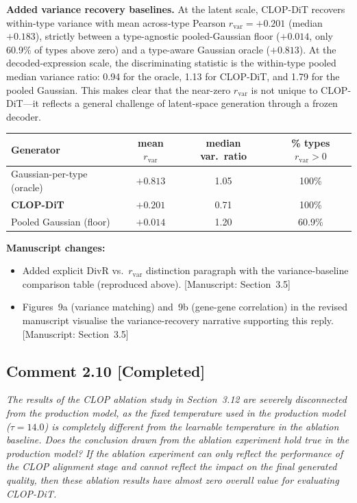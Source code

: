 \documentclass[11pt,letterpaper]{article}
\newcommand{\statuscompleted}{\textcolor{statusgreen}{\textbf{[Completed]}}}
\newcommand{\msref}[1]{\textcolor{blue!60!black}{\textsf{[Manuscript: #1]}}}
\begin{document}
\begin{revisionupdate}
\textbf{Added variance recovery baselines.}
At the latent scale, CLOP-DiT recovers within-type variance with mean across-type Pearson $r_\text{var} = +0.201$ (median $+0.183$), strictly between a type-agnostic pooled-Gaussian floor ($+0.014$, only 60.9\% of types above zero) and a type-aware Gaussian oracle ($+0.813$). At the decoded-expression scale, the discriminating statistic is the within-type pooled median variance ratio: 0.94 for the oracle, 1.13 for CLOP-DiT, and 1.79 for the pooled Gaussian. This makes clear that the near-zero $r_\text{var}$ is not unique to CLOP-DiT---it reflects a general challenge of latent-space generation through a frozen decoder.

\medskip
\begin{tabular}{@{}lccc@{}}
\toprule
\textbf{Generator} & \textbf{mean $r_\text{var}$} & \textbf{median var.\ ratio} & \textbf{\% types $r_\text{var} > 0$} \\
\midrule
Gaussian-per-type (oracle) & $+0.813$ & 1.05 & 100\% \\
\textbf{CLOP-DiT} & $\mathbf{+0.201}$ & 0.71 & 100\% \\
Pooled Gaussian (floor) & $+0.014$ & 1.20 & 60.9\% \\
\bottomrule
\end{tabular}
\end{revisionupdate}

\noindent\textbf{Manuscript changes:}
\begin{itemize}
  \item Added explicit DivR vs.\ $r_\text{var}$ distinction paragraph with the variance-baseline comparison table (reproduced above). \msref{Section~3.5}
  \item Figures~9a (variance matching) and~9b (gene-gene correlation) in the revised manuscript visualise the variance-recovery narrative supporting this reply. \msref{Section~3.5}
\end{itemize}

\medskip

\subsection*{Comment 2.10 \hfill \statuscompleted}

\begin{reviewercomment}
\itshape
The results of the CLOP ablation study in Section~3.12 are severely disconnected from the production model, as the fixed temperature used in the production model ($\tau=14.0$) is completely different from the learnable temperature in the ablation baseline. Does the conclusion drawn from the ablation experiment hold true in the production model? If the ablation experiment can only reflect the performance of the CLOP alignment stage and cannot reflect the impact on the final generated quality, then these ablation results have almost zero overall value for evaluating CLOP-DiT.
\end{reviewercomment}
\end{document}
